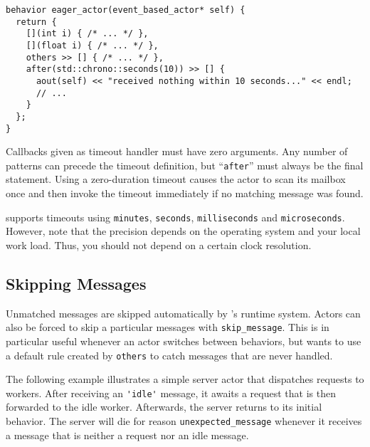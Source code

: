 \begin{lstlisting}
behavior eager_actor(event_based_actor* self) {
  return {
    [](int i) { /* ... */ },
    [](float i) { /* ... */ },
    others >> [] { /* ... */ },
    after(std::chrono::seconds(10)) >> [] {
      aout(self) << "received nothing within 10 seconds..." << endl;
      // ...
    }
  };
}
\end{lstlisting}

Callbacks given as timeout handler must have zero arguments.
Any number of patterns can precede the timeout definition, but  ``\lstinline^after^'' must always be the final statement.
Using a zero-duration timeout causes the actor to scan its mailbox once and then invoke the timeout immediately if no matching message was found.

\lib supports timeouts using \lstinline^minutes^, \lstinline^seconds^, \lstinline^milliseconds^ and \lstinline^microseconds^.
However, note that the precision depends on the operating system and your local work load.
Thus, you should not depend on a certain clock resolution.

\subsection{Skipping Messages}

Unmatched messages are skipped automatically by \lib's runtime system.
Actors can also be forced to skip a particular messages with \lstinline^skip_message^.
This is in particular useful whenever an actor switches between behaviors, but wants to use a default rule created by \lstinline^others^ to catch messages that are never handled.

The following example illustrates a simple server actor that dispatches requests to workers.
After receiving an \lstinline^'idle'^ message, it awaits a request that is then forwarded to the idle worker.
Afterwards, the server returns to its initial behavior.
The server will die for reason \lstinline^unexpected_message^ whenever it receives a message that is neither a request nor an idle message.

\clearpage

